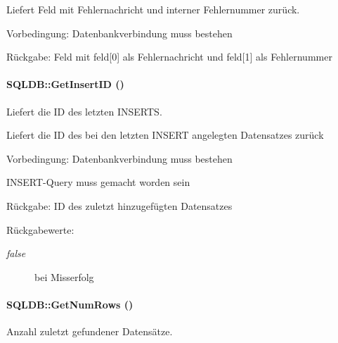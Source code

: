 Liefert Feld mit Fehlernachricht und interner Fehlernummer zurück. \begin{Desc}
\item[Vorbedingung:]Datenbankverbindung muss bestehen \end{Desc}
\begin{Desc}
\item[R\"{u}ckgabe:]Feld mit feld\mbox{[}0\mbox{]} als Fehlernachricht und feld\mbox{[}1\mbox{]} als Fehlernummer \end{Desc}
\hypertarget{classSQLDB_094a5b811d412900f2435cabb2194fb8}{
\paragraph[GetInsertID]{\setlength{\rightskip}{0pt plus 5cm}SQLDB::Get\-Insert\-ID ()}\hfill}
\label{classSQLDB_094a5b811d412900f2435cabb2194fb8}


Liefert die ID des letzten INSERTS. 

Liefert die ID des bei den letzten INSERT angelegten Datensatzes zurück \begin{Desc}
\item[Vorbedingung:]Datenbankverbindung muss bestehen 

INSERT-Query muss gemacht worden sein \end{Desc}
\begin{Desc}
\item[R\"{u}ckgabe:]ID des zuletzt hinzugefügten Datensatzes \end{Desc}
\begin{Desc}
\item[R\"{u}ckgabewerte:]
\begin{description}
\item[{\em false}]bei Misserfolg \end{description}
\end{Desc}
\hypertarget{classSQLDB_15b181251b309ab55331be29fa33ac9f}{
\paragraph[GetNumRows]{\setlength{\rightskip}{0pt plus 5cm}SQLDB::Get\-Num\-Rows ()}\hfill}
\label{classSQLDB_15b181251b309ab55331be29fa33ac9f}


Anzahl zuletzt gefundener Datensätze. 

